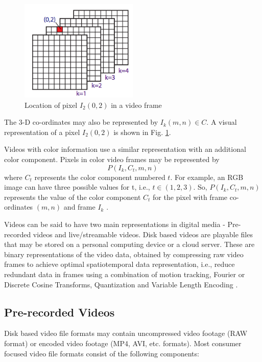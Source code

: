 \documentclass[letterpaper,12pt,titlepage,oneside,final]{report}
\begin{document}
        \begin{figure}[!h]
            \centering
            \includegraphics[width=0.5\textwidth]{framearch}
            \caption{Location of pixel $I_2(0,2)$ in a video frame}
            \label{framearch}
        \end{figure}
        
        The 3-D co-ordinates may also be represented by $I_k(m, n) \in C$. A visual representation of a pixel $I_2(0,2)$ is shown in Fig. \ref{framearch}\cite{Kundur}.
        
        Videos with color information use a similar representation with an additional color component. Pixels in color video frames may be represented by $$P(I_k, C_t, m, n )$$ where $C_t$ represents the color component numbered $t$. For example, an RGB image can have three possible values for t, i.e., $t \in (1, 2, 3)$. So, $P(I_k, C_t, m, n)$ represents the value of the color component $C_t$ for the pixel with frame co-ordinates $(m, n)$ and frame $I_k$ \cite{Lefevre2003}.

        Videos can be said to have two main representations in digital media - Pre-recorded videos and live/streamable videos. Disk based videos are playable files that may be stored on a personal computing device or a cloud server. These are binary representations of the video data, obtained by compressing raw video frames to achieve optimal spatiotemporal data representation, i.e., reduce redundant data in frames using a combination of motion tracking, Fourier or Discrete Cosine Transforms, Quantization and Variable Length Encoding \cite{Choupani}.
        \subsection{Pre-recorded Videos}
            Disk based video file formats may contain uncompressed video footage (RAW format) or encoded video footage (MP4, AVI, etc. formats). Most consumer focused video file formats consist of the following components:
\end{document}
